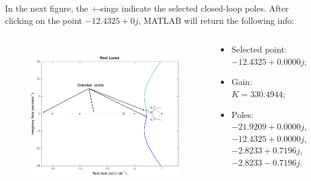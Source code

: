 \begin{frame}
	\begin{exampleblock}{}
		\justify
		In the next figure, the \textcolor{red}{$+$}-sings indicate the selected closed-loop poles. After clicking on the point $-12.4325 + 0j$, MATLAB will return the following info:
	\begin{columns}
		\begin{column}{0.5\textwidth}
		\begin{figure}
			\hbox{\hspace{2.8em}
			\includegraphics[width=1.1\linewidth]{matlab_ex3}}
		\end{figure}
		\end{column}
		
		\begin{column}{0.5\textwidth}
			\begin{itemize}
				\item Selected point: $-12.4325 + 0.0000j$;
				\item Gain:\\ $K = 330.4944$;
				\item Poles:\\ $-21.9209 + 0.0000j$, $-12.4325 + 0.0000j$, $-2.8233 + 0.7196j$, $-2.8233 - 0.7196j$.
			\end{itemize}
		\end{column}
	\end{columns}
	\end{exampleblock}
\end{frame}

